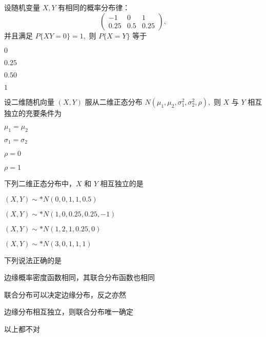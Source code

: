 \documentclass{exam-zh}
\begin{document}
\begin{question}
  设随机变量 $X, Y$ 有相同的概率分布律：  
  $$
  \begin{pmatrix}
  -1 & 0 & 1 \\
  0.25 & 0.5 & 0.25
  \end{pmatrix},$$
  并且满足 $P\{XY = 0\} = 1,$ 则
  $P\{X = Y\}$ 等于 \paren[A]
  \begin{choices}
    \item $0$  
    \item $0.25$  
    \item $0.50$  
    \item $1$  
  \end{choices}
\end{question}

\begin{question}
  设二维随机向量 $(X, Y)$ 服从二维正态分布  
  $N(\mu_1, \mu_2, \sigma_1^2, \sigma_2^2, \rho),$  
  则 $X$ 与 $Y$ 相互独立的充要条件为 \paren[C]
  \begin{choices}
    \item $\mu_1 = \mu_2$  
    \item $\sigma_1 = \sigma_2$  
    \item $\rho = 0$  
    \item $\rho = 1$  
  \end{choices}
\end{question}

\begin{question}
  下列二维正态分布中，$X$ 和 $Y$ 相互独立的是 \paren[C]
  \begin{choices}
    \item $(X, Y) \sim* N(0, 0, 1, 1, 0.5)$  
    \item $(X, Y) \sim* N(1, 0, 0.25, 0.25, -1)$  
    \item $(X, Y) \sim* N(1, 2, 1, 0.25, 0)$  
    \item $(X, Y) \sim* N(3, 0, 1, 1, 1)$  
  \end{choices}
\end{question}

\begin{question}
  下列说法正确的是 \paren[C]
  \begin{choices}
    \item 边缘概率密度函数相同，其联合分布函数也相同  
    \item 联合分布可以决定边缘分布，反之亦然  
    \item 边缘分布相互独立，则联合分布唯一确定  
    \item 以上都不对  
  \end{choices}
\end{question}
\end{document}
